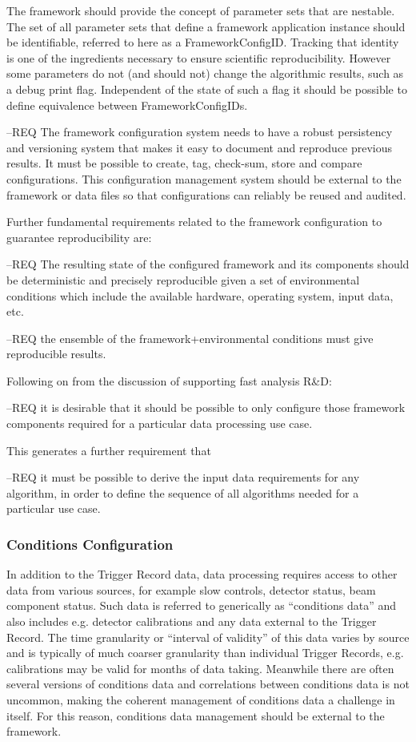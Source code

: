 \documentclass[../main-v1.tex]{subfiles}
\begin{document}
The framework should provide the concept of parameter sets that are nestable.  The set of all parameter sets that define a framework application instance should be identifiable, referred to here as a FrameworkConfigID.  Tracking that identity is one of the ingredients necessary to ensure scientific reproducibility.  However some parameters do not (and should not) change the algorithmic results, such as a debug print flag.  Independent of the state of such a flag it should be possible to define equivalence between FrameworkConfigIDs.

--REQ The framework configuration system needs to have a robust persistency and versioning system that makes it easy to document and reproduce previous results.  It must be possible to create, tag, check-sum, store and compare configurations.  This configuration management system should be external to the framework or data files so that configurations can reliably be reused and audited.  

Further fundamental requirements related to the framework configuration to guarantee reproducibility are:

--REQ The resulting state of the configured framework and its components should be deterministic and precisely reproducible given a set of environmental conditions which include the available hardware, operating system, input data, etc.  

--REQ the ensemble of the framework+environmental conditions must give reproducible results.  

Following on from the discussion of supporting fast analysis R\&D:

--REQ it is desirable that it should be possible to only configure those framework components required for a particular data processing use case.  

This generates a further requirement that 

--REQ it must be possible to derive the input data requirements for any algorithm, in order to define the sequence of all algorithms needed for a particular use case.
 
\subsubsection{Conditions Configuration}

In addition to the Trigger Record data, data processing requires access to other data from various sources, for example slow controls, detector status, beam component status.  Such data is referred to generically as “conditions data” and also includes e.g. detector calibrations and any data external to the Trigger Record.  The time granularity or “interval of validity” of this data varies by source and is typically of much coarser granularity than individual Trigger Records, e.g. calibrations may be valid for months of data taking.  Meanwhile there are often several versions of conditions data and correlations between conditions data is not uncommon, making the coherent management of conditions data a challenge in itself.  For this reason, conditions data management should be external to the framework.
\end{document}

